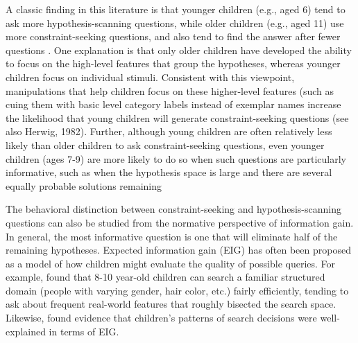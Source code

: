 \documentclass[man,floatsintext]{apa6}
\begin{document}
A classic finding in this literature is that younger children (e.g., aged 6) tend to ask more hypothesis-scanning questions, while older children (e.g., aged 11) use more constraint-seeking  questions, and also 
tend to find the answer after fewer questions \cite{Mosher:1966}. 
One explanation is that only older children have developed the ability to focus on the 
high-level features that group the hypotheses, whereas younger children focus on individual stimuli.
Consistent with this viewpoint, manipulations that help children focus on these higher-level features (such as cuing them with basic level category labels instead of exemplar names 
\cite{Ruggeri:2015front} increase the likelihood that young children will generate constraint-seeking questions (see also Herwig, 1982).
Further, although young children are often relatively less likely than older children to ask constraint-seeking questions, even younger children (ages 7-9) are 
more likely to do so when such questions are particularly informative, such as when the hypothesis space is large and there are several equally probable solutions remaining \cite{Ruggeri:2014,Ruggeri:2015}
\nocite{Herwig:1982}



The behavioral distinction between constraint-seeking and hypothesis-scanning questions can also be studied from the normative perspective of information gain. In general, the most informative question is one that will eliminate half of the remaining hypotheses. 
 Expected information gain (EIG) has often been proposed as a model of how children might evaluate the quality of possible queries.  For example,  found that 8-10 year-old children can search a familiar structured domain (people with varying gender, hair color, etc.) fairly efficiently, tending to ask about frequent real-world features that roughly bisected the search space. 
 Likewise,  found evidence that children's patterns of search decisions were well-explained in terms of EIG.
\end{document}
